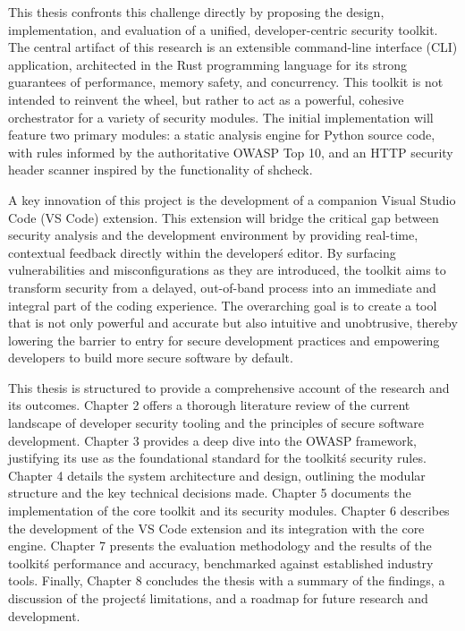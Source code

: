 This thesis confronts this challenge directly by proposing the design, implementation, and evaluation of a unified, developer-centric security toolkit. The central artifact of this research is an extensible command-line interface (CLI) application, architected in the Rust programming language for its strong guarantees of performance, memory safety, and concurrency. This toolkit is not intended to reinvent the wheel, but rather to act as a powerful, cohesive orchestrator for a variety of security modules. The initial implementation will feature two primary modules: a static analysis engine for Python source code, with rules informed by the authoritative OWASP Top 10, and an HTTP security header scanner inspired by the functionality of shcheck.

A key innovation of this project is the development of a companion Visual Studio Code (VS Code) extension. This extension will bridge the critical gap between security analysis and the development environment by providing real-time, contextual feedback directly within the developer\'s editor. By surfacing vulnerabilities and misconfigurations as they are introduced, the toolkit aims to transform security from a delayed, out-of-band process into an immediate and integral part of the coding experience. The overarching goal is to create a tool that is not only powerful and accurate but also intuitive and unobtrusive, thereby lowering the barrier to entry for secure development practices and empowering developers to build more secure software by default.

This thesis is structured to provide a comprehensive account of the research and its outcomes. Chapter 2 offers a thorough literature review of the current landscape of developer security tooling and the principles of secure software development. Chapter 3 provides a deep dive into the OWASP framework, justifying its use as the foundational standard for the toolkit\'s security rules. Chapter 4 details the system architecture and design, outlining the modular structure and the key technical decisions made. Chapter 5 documents the implementation of the core toolkit and its security modules. Chapter 6 describes the development of the VS Code extension and its integration with the core engine. Chapter 7 presents the evaluation methodology and the results of the toolkit\'s performance and accuracy, benchmarked against established industry tools. Finally, Chapter 8 concludes the thesis with a summary of the findings, a discussion of the project\'s limitations, and a roadmap for future research and development.